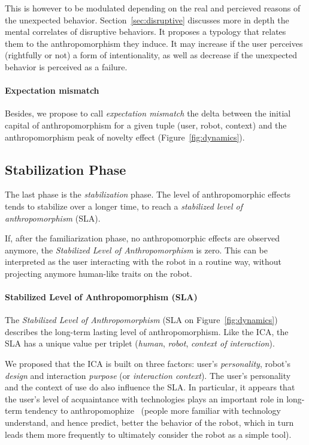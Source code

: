 \documentclass{frontiersSCNS} %
\begin{document}
This is however to be modulated depending on the real and percieved reasons of the
unexpected behavior.  Section~\ref{sec:disruptive} discusses more in depth the
mental correlates of disruptive behaviors. It proposes a typology that relates
them to the anthropomorphism they induce. It may increase if the user perceives
(rightfully or not) a form of intentionality, as well as decrease if the
unexpected behavior is perceived as a failure.

\paragraph{Expectation mismatch}

Besides, we propose to call \emph{expectation mismatch} the delta between the
initial capital of anthropomorphism for a given tuple (user, robot, context)
and the anthropomorphism peak of novelty effect (Figure~\ref{fig:dynamics}).

\subsection*{Stabilization Phase}
\label{sec:stabilization}

The last phase is the \emph{stabilization} phase. The level of anthropomorphic
effects tends to stabilize over a longer time, to reach a \emph{stabilized
level of anthropomorphism} (SLA).

If, after the familiarization phase, no anthropomorphic effects are observed
anymore, the \emph{Stabilized Level of Anthropomorphism} is zero. This can
be interpreted as the user interacting with the robot in a routine way, without
projecting anymore human-like traits on the robot.


\paragraph{Stabilized Level of Anthropomorphism (SLA)}

The \emph{Stabilized Level of Anthropomorphism} (SLA on
Figure~\ref{fig:dynamics}) describes the long-term lasting level of
anthropomorphism.  Like the ICA, the SLA has a unique value per triplet
(\emph{human}, \emph{robot}, \emph{context of interaction}).

We proposed that the ICA is built on three factors: user's \emph{personality},
robot's \emph{design} and interaction \emph{purpose} (or \emph{interaction
context}). The user's personality and the context of use do also influence the
SLA. In particular, it appears that the user's level of acquaintance with
technologies plays an important role in long-term tendency to
anthropomophize~\cite{fink_living_2013} (people more familiar with technology
understand, and hence predict, better the behavior of the robot, which in turn
leads them more frequently to ultimately consider the robot as a simple tool).
\end{document}
